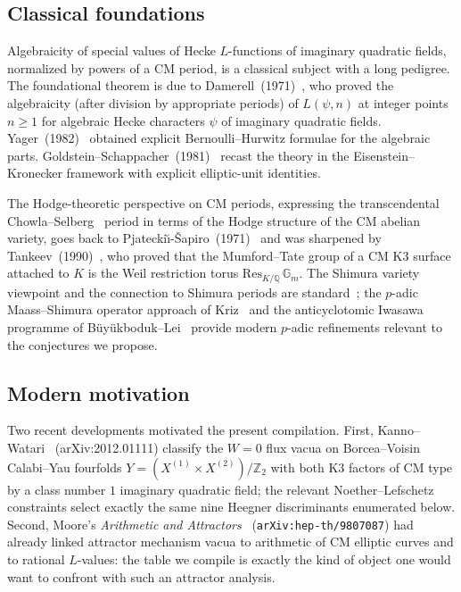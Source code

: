 \documentclass[12pt]{amsart}
\theoremstyle{definition}
\newcommand{\Q}{\mathbb{Q}}
\newcommand{\Z}{\mathbb{Z}}
\begin{document}
\subsection{Classical foundations}

Algebraicity of special values of Hecke $L$-functions of imaginary
quadratic fields, normalized by powers of a CM period, is a classical
subject with a long pedigree. The foundational theorem is due to
Damerell~(1971)~\cite{Damerell1971}, who proved the algebraicity (after
division by appropriate periods) of $L(\psi, n)$ at integer points $n \geq 1$
for algebraic Hecke characters $\psi$ of imaginary quadratic fields.
Yager~(1982)~\cite{Yager1982} obtained explicit Bernoulli--Hurwitz formulae
for the algebraic parts. Goldstein--Schappacher~(1981)~\cite{GoldsteinSchappacher1981}
recast the theory in the Eisenstein--Kronecker framework with explicit
elliptic-unit identities.

The Hodge-theoretic perspective on CM periods, expressing the
transcendental Chowla--Selberg~\cite{ChowlaSelberg1949} period in terms of
the Hodge structure of the CM abelian variety, goes back to
Pjatecki\u{\i}-\v{S}apiro~(1971)~\cite{CITE-NEEDED-PS1971} and was
sharpened by Tankeev~(1990)~\cite{CITE-NEEDED-Tankeev1990}, who proved that
the Mumford--Tate group of a CM K3 surface attached to $K$ is the Weil
restriction torus $\mathrm{Res}_{K/\Q}\,\mathbb{G}_m$.
The Shimura variety viewpoint and the connection to Shimura periods are
standard~\cite{CITE-NEEDED-Shimura1971,CITE-NEEDED-Schappacher1988}; the
$p$-adic Maass--Shimura operator approach of Kriz~\cite{Kriz2018} and the
anticyclotomic Iwasawa programme of B\"uy\"ukboduk--Lei~\cite{BuyukbodukLei2016}
provide modern $p$-adic refinements relevant to the conjectures we propose.

\subsection{Modern motivation}

Two recent developments motivated the present compilation.
First, Kanno--Watari~\cite{KannoWatari2020} (arXiv:2012.01111) classify the
$W=0$ flux vacua on Borcea--Voisin Calabi--Yau fourfolds
$Y = (X^{(1)} \times X^{(2)})/\Z_2$ with both $\mathrm{K3}$ factors of
CM type by a class number $1$ imaginary quadratic field; the relevant
Noether--Lefschetz constraints select exactly the same nine Heegner
discriminants enumerated below.
Second, Moore's \emph{Arithmetic and Attractors}~\cite{Moore1998}
(\texttt{arXiv:hep-th/9807087}) had already linked attractor
mechanism vacua to arithmetic of CM elliptic curves and to rational
$L$-values: the table we compile is exactly the kind of object one would
want to confront with such an attractor analysis.
\end{document}
